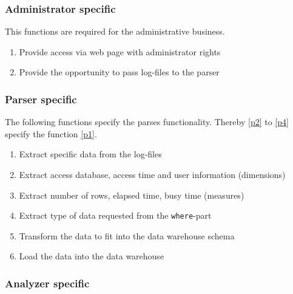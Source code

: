 \subsubsection*{Administrator specific}
This functions are required for the administrative business.

\begin{enumerate}[resume]
  
  \item Provide access via web page with administrator rights
   
  \item Provide the opportunity to pass log-files to the parser
   
\end{enumerate}


\subsubsection*{Parser specific}
 
 The following functions specify the parses functionality.
 Thereby \ref{p2} to \ref{p4} specify the function \ref{p1}.
 
\begin{enumerate}[resume]
  
  \item Extract specific data from the log-files \label{p1}
  
  \item Extract access database, access time and user information (dimensions)\label{p2} %
  
  \item Extract number of rows, elapsed time, busy time (measures) %
  
  \item Extract type of data requested from the \texttt{where}-part\label{p4} %
  
  \item Transform the data to fit into the data warehouse schema
  
  \item Load the data into the data warehouse

\end{enumerate}

\subsubsection*{Analyzer specific}
 
